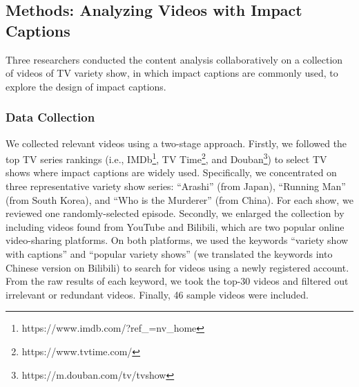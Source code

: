 



\subsection{Methods: Analyzing Videos with Impact Captions}
Three researchers conducted the content analysis collaboratively on a collection of videos of TV variety show, in which impact captions are commonly used, to explore the design of impact captions.



\subsubsection{Data Collection}
We collected relevant videos using a two-stage approach.
Firstly, we followed the top TV series rankings (i.e., IMDb\footnote{https://www.imdb.com/?ref\_=nv\_home}, TV Time\footnote{https://www.tvtime.com/}, and Douban\footnote{https://m.douban.com/tv/tvshow}) to select TV shows where impact captions are widely used. 
Specifically, we concentrated on three representative variety show series: ``Arashi'' (from Japan), ``Running Man'' (from South Korea), and ``Who is the Murderer'' (from China). For each show, we reviewed one randomly-selected episode.
Secondly, we enlarged the collection by including videos found from YouTube and Bilibili, which are two popular online video-sharing platforms. 
On both platforms, we used the keywords ``variety show with captions'' and ``popular variety shows'' (we translated the keywords into Chinese version on Bilibili) to search for videos using a newly registered account. From the raw results of each keyword, we took the top-30 videos and filtered out irrelevant or redundant videos. Finally, 46 sample videos were included.

